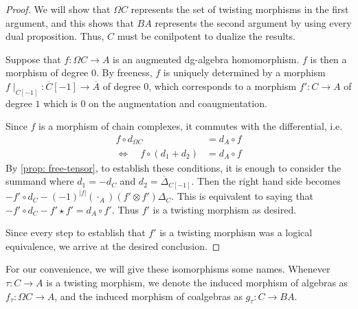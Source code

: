 \documentclass[../thesis.tex]{subfiles}
\begin{document}
            \begin{proof}
                We will show that $\Omega C$ represents the set of twisting morphisms in the first argument, and this shows that $BA$ represents the second argument by using every dual proposition. Thus, $C$ must be conilpotent to dualize the results.

                Suppose that $f:\Omega C \rightarrow A$ is an augmented dg-algebra homomorphism. $f$ is then a morphism of degree $0$. By freeness, $f$ is uniquely determined by a morphism $f\mid_{\overline{C}[-1]}:\overline{C}[-1]\rightarrow \overline{A}$ of degree $0$, which corresponds to a morphism $f':C\rightarrow A$ of degree $1$ which is $0$ on the augmentation and coaugmentation. 

                Since $f$ is a morphism of chain complexes, it commutes with the differential, i.e. 
                \begin{align*}
                    f\circ d_{\Omega C} & = d_A\circ f \\
                    \Leftrightarrow\quad f\circ (d_1 + d_2) & = d_A\circ f 
                \end{align*}
                By \ref{prop: free-tensor}, to establish these conditions, it is enough to consider the summand where $d_1 = -d_C$ and $d_2 = \overline{\Delta}_{C[-1]}$. Then the right hand side becomes $-f' \circ d_C - (-1)^{|f|}(\cdot_A)(f' \otimes f')\Delta_C$. This is equivalent to saying that $-f'\circ d_C - f'\star f' = d_A\circ f'$. Thus $f'$ is a twisting morphism as desired.

                Since every step to establish that $f'$ is a twisting morphism was a logical equivalence, we arrive at the desired conclusion.
            \end{proof}

            For our convenience, we will give these isomorphisms some names. Whenever $\tau: C \rightarrow A$ is a twisting morphism, we denote the induced morphism of algebras as $f_\tau: \Omega C \rightarrow A$, and the induced morphism of coalgebras as $g_\tau: C \rightarrow BA$.
\end{document}
